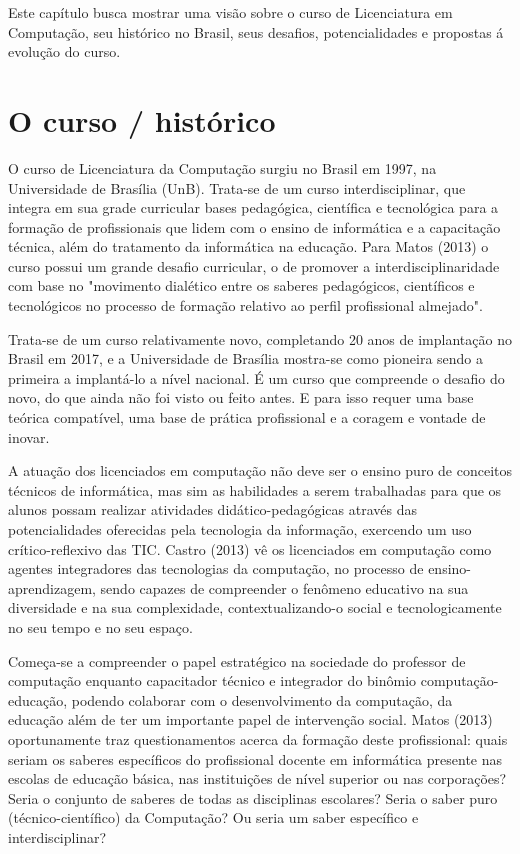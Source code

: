 
Este capítulo busca mostrar uma visão sobre o curso de Licenciatura em Computação, seu histórico no Brasil, seus desafios, potencialidades e propostas á evolução do curso.

\section{O curso / histórico}%
 
O curso de Licenciatura da Computação surgiu no Brasil em 1997, na Universidade de Brasília (UnB). Trata-se de um curso interdisciplinar, que integra em sua grade curricular bases pedagógica, científica e tecnológica para a formação de profissionais que lidem com o ensino de informática e a capacitação técnica, além do tratamento da informática na educação. Para Matos (2013) o curso possui um grande desafio curricular, o de promover a interdisciplinaridade com base no "movimento dialético entre os saberes pedagógicos, científicos e tecnológicos no processo de formação relativo ao perfil profissional almejado".

Trata-se de um curso relativamente novo, completando 20 anos de implantação no Brasil em 2017, e a Universidade de Brasília mostra-se como pioneira sendo a primeira a implantá-lo a nível nacional. É um curso que compreende o desafio do novo, do que ainda não foi visto ou feito antes. E para isso requer uma base teórica compatível, uma base de prática profissional e a coragem e vontade de inovar.

A atuação dos licenciados em computação não deve ser o ensino puro de conceitos técnicos de informática, mas sim as habilidades a serem trabalhadas para que os alunos possam realizar atividades didático-pedagógicas através das potencialidades oferecidas pela tecnologia da informação, exercendo um uso crítico-reflexivo das TIC. Castro (2013) vê os licenciados em computação como agentes integradores das tecnologias da computação, no processo de ensino-aprendizagem, sendo capazes de compreender o fenômeno educativo na sua diversidade e na sua complexidade, contextualizando-o social e tecnologicamente no seu tempo e no seu espaço.
 
Começa-se a compreender o papel estratégico na sociedade do professor de computação enquanto capacitador técnico e integrador do binômio computação-educação, podendo colaborar com o desenvolvimento da computação, da educação além de ter um importante papel de intervenção social. Matos (2013) oportunamente traz questionamentos acerca da formação deste profissional: quais seriam os saberes específicos do profissional docente em informática presente nas escolas de educação básica, nas instituições de nível superior ou nas corporações? Seria o conjunto de saberes de todas as disciplinas escolares? Seria o saber puro (técnico-científico) da Computação? Ou seria um saber específico e interdisciplinar?
 

